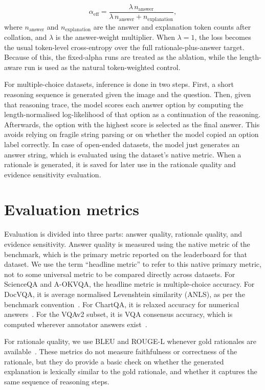 \documentclass[12pt,bibliography=totoc,listof=totoc,BCOR=5mm,DIV=12,oneside,open=any]{scrbook}
\let\cite\citep
\begin{document}
\begin{equation}
    \alpha_{\text{eff}} =
    \frac{\lambda\,n_{\text{answer}}}{\lambda\,n_{\text{answer}} + n_{\text{explanation}}},
    \label{Eq:LengthAlpha}
\end{equation}
where $n_{\text{answer}}$ and $n_{\text{explanation}}$ are the answer and explanation token counts after collation, and $\lambda$ is the answer-weight multiplier.
When $\lambda=1$, the loss becomes the usual token-level cross-entropy over the full rationale-plus-answer target.
Because of this, the fixed-alpha runs are treated as the ablation, while the length-aware run is used as the natural token-weighted control.

For multiple-choice datasets, inference is done in two steps.
First, a short reasoning sequence is generated given the image and the question.
Then, given that reasoning trace, the model scores each answer option by computing the length-normalised log-likelihood of that option as a continuation of the reasoning.
Afterwards, the option with the highest score is selected as the final answer.
This avoids relying on fragile string parsing or on whether the model copied an option label correctly.
In case of open-ended datasets, the model just generates an answer string, which is evaluated using the dataset's native metric.
When a rationale is generated, it is saved for later use in the rationale quality and evidence sensitivity evaluation.

\section{Evaluation metrics}
Evaluation is divided into three parts: answer quality, rationale quality, and evidence sensitivity.
Answer quality is measured using the native metric of the benchmark, which is the primary metric reported on the leaderboard for that dataset.
We use the term ``headline metric'' to refer to this native primary metric,
not to some universal metric to be compared directly across datasets.
For ScienceQA and A-OKVQA, the headline metric is multiple-choice accuracy.
For DocVQA, it is average normalised Levenshtein similarity (ANLS), as per the benchmark convention~\cite{mathew2021docvqa}.
For ChartQA, it is relaxed accuracy for numerical answers~\cite{masry2022chartqa}.
For the VQAv2 subset, it is VQA consensus accuracy, which is computed wherever annotator answers exist~\cite{antol2015vqa,goyal2017vqav2}.

For rationale quality, we use BLEU and ROUGE-L whenever gold rationales are available~\cite{papineni2002bleu,lin2004rouge}.
These metrics do not measure faithfulness or correctness of the rationale, but they do provide a basic check on 
whether the generated explanation is lexically similar to the gold rationale, and whether it captures the same sequence of reasoning steps.
\end{document}

